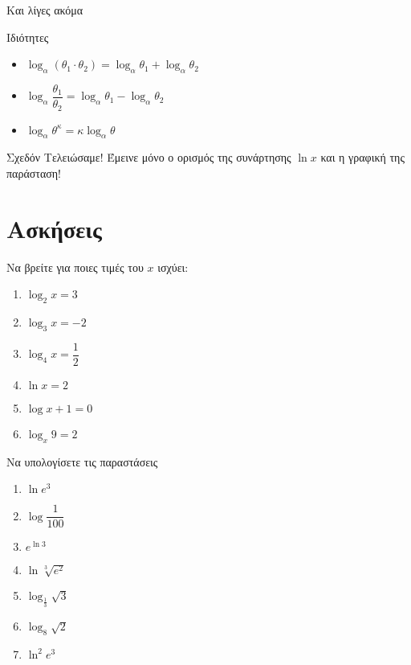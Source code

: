 \documentclass[greek]{beamer}
\begin{document}
\begin{frame}[label=Ιδιότητες]{Και λίγες ακόμα}
  \begin{block}{Ιδιότητες}
    \begin{itemize}
      \item<1-> $\log_α\left( θ_1\cdot θ_2 \right)=\log_αθ_1+\log_αθ_2 $
      \item<2-> $\log_α\dfrac{θ_1}{θ_2}=\log_αθ_1-\log_αθ_2 $
      \item<3-> $\log_αθ^κ=κ\log_αθ$
    \end{itemize}
  \end{block}
  \hyperlink{Απόδειξη1}{}
\end{frame}

\begin{frame}{Σχεδόν Τελειώσαμε!}
  Έμεινε μόνο ο ορισμός της συνάρτησης $\ln x$ και η γραφική της παράσταση!
\end{frame}

\section{Ασκήσεις}
\begin{askisi}
  Να βρείτε για ποιες τιμές του $x$ ισχύει:
  \begin{enumerate}
    \item<1-> $\log_2x=3$
    \item<2-> $\log_3x=-2$
    \item<3-> $\log_4x=\dfrac{1}{2}$
    \item<4-> $\ln x=2$
    \item<5-> $\log x+1=0$
    \item<6-> $\log_x9=2$
  \end{enumerate}


\end{askisi}

\begin{askisi}
  Να υπολογίσετε τις παραστάσεις
  \begin{enumerate}
    \item<1-> $\ln e^3$
    \item<2-> $\log\dfrac{1}{100}$
    \item<3-> $e^{\ln 3}$
    \item<4-> $\ln \sqrt[3]{e^2}$
    \item<5-> $\log_{\frac{1}{3}}\sqrt{3}$
    \item<6-> $\log_8\sqrt{2}$
    \item<7-> $\ln^2e^3$
  \end{enumerate}

  \hyperlink{Θεωρία1}{}

\end{askisi}
\end{document}
